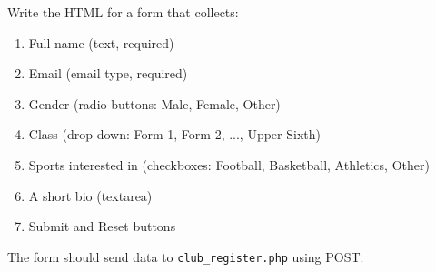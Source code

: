 \documentclass[11pt]{article}
\begin{document}
\begin{exoresolu}
Write the HTML for a form that collects:
\begin{enumerate}
  \item Full name (text, required)
  \item Email (email type, required)
  \item Gender (radio buttons: Male, Female, Other)
  \item Class (drop-down: Form 1, Form 2, ..., Upper Sixth)
  \item Sports interested in (checkboxes: Football, Basketball, Athletics, Other)
  \item A short bio (textarea)
  \item Submit and Reset buttons
\end{enumerate}
The form should send data to \texttt{club\_register.php} using POST.


\end{exoresolu}
\end{document}
